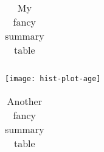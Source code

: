 \documentclass[fontsize=12pt, paper=a4]{scrartcl}
\begin{document}
\begin{table}
\caption{My fancy summary table}
\begin{tabular}{lll}

\end{tabular}
\end{table}

\texttt{[image: hist-plot-age]}


\begin{table}[h]
\caption{Another fancy summary table}
\begin{tabular}{rrrrrrrr}
\toprule

\end{tabular}
\end{table}
\end{document}
